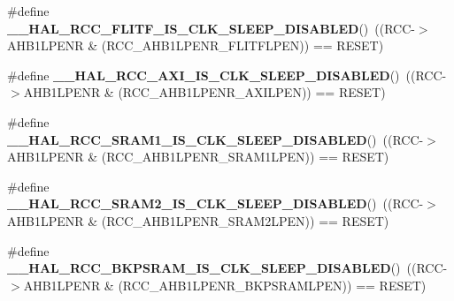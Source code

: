 \begin{DoxyCompactItemize}
\item 
\mbox{\label{group___r_c_c___clock___sleep___enable___disable___status_ga06858d9e8310f1d9d2763472d37e9d9c}} 
\#define {\bfseries \+\_\+\+\_\+\+H\+A\+L\+\_\+\+R\+C\+C\+\_\+\+F\+L\+I\+T\+F\+\_\+\+I\+S\+\_\+\+C\+L\+K\+\_\+\+S\+L\+E\+E\+P\+\_\+\+D\+I\+S\+A\+B\+L\+ED}()~((R\+CC-\/$>$A\+H\+B1\+L\+P\+E\+NR \& (R\+C\+C\+\_\+\+A\+H\+B1\+L\+P\+E\+N\+R\+\_\+\+F\+L\+I\+T\+F\+L\+P\+EN)) == R\+E\+S\+ET)
\item 
\mbox{\label{group___r_c_c___clock___sleep___enable___disable___status_gacf8d2f4a34aa0308700e92acc535e992}} 
\#define {\bfseries \+\_\+\+\_\+\+H\+A\+L\+\_\+\+R\+C\+C\+\_\+\+A\+X\+I\+\_\+\+I\+S\+\_\+\+C\+L\+K\+\_\+\+S\+L\+E\+E\+P\+\_\+\+D\+I\+S\+A\+B\+L\+ED}()~((R\+CC-\/$>$A\+H\+B1\+L\+P\+E\+NR \& (R\+C\+C\+\_\+\+A\+H\+B1\+L\+P\+E\+N\+R\+\_\+\+A\+X\+I\+L\+P\+EN)) == R\+E\+S\+ET)
\item 
\mbox{\label{group___r_c_c___clock___sleep___enable___disable___status_ga80892166d5a107df14d2420859bbd4e0}} 
\#define {\bfseries \+\_\+\+\_\+\+H\+A\+L\+\_\+\+R\+C\+C\+\_\+\+S\+R\+A\+M1\+\_\+\+I\+S\+\_\+\+C\+L\+K\+\_\+\+S\+L\+E\+E\+P\+\_\+\+D\+I\+S\+A\+B\+L\+ED}()~((R\+CC-\/$>$A\+H\+B1\+L\+P\+E\+NR \& (R\+C\+C\+\_\+\+A\+H\+B1\+L\+P\+E\+N\+R\+\_\+\+S\+R\+A\+M1\+L\+P\+EN)) == R\+E\+S\+ET)
\item 
\mbox{\label{group___r_c_c___clock___sleep___enable___disable___status_ga78941ee33c71aa732c6e865048574d37}} 
\#define {\bfseries \+\_\+\+\_\+\+H\+A\+L\+\_\+\+R\+C\+C\+\_\+\+S\+R\+A\+M2\+\_\+\+I\+S\+\_\+\+C\+L\+K\+\_\+\+S\+L\+E\+E\+P\+\_\+\+D\+I\+S\+A\+B\+L\+ED}()~((R\+CC-\/$>$A\+H\+B1\+L\+P\+E\+NR \& (R\+C\+C\+\_\+\+A\+H\+B1\+L\+P\+E\+N\+R\+\_\+\+S\+R\+A\+M2\+L\+P\+EN)) == R\+E\+S\+ET)
\item 
\mbox{\label{group___r_c_c___clock___sleep___enable___disable___status_gabdd24f8df73719bdebf692b490e57cd3}} 
\#define {\bfseries \+\_\+\+\_\+\+H\+A\+L\+\_\+\+R\+C\+C\+\_\+\+B\+K\+P\+S\+R\+A\+M\+\_\+\+I\+S\+\_\+\+C\+L\+K\+\_\+\+S\+L\+E\+E\+P\+\_\+\+D\+I\+S\+A\+B\+L\+ED}()~((R\+CC-\/$>$A\+H\+B1\+L\+P\+E\+NR \& (R\+C\+C\+\_\+\+A\+H\+B1\+L\+P\+E\+N\+R\+\_\+\+B\+K\+P\+S\+R\+A\+M\+L\+P\+EN)) == R\+E\+S\+ET)

\end{DoxyCompactItemize}
